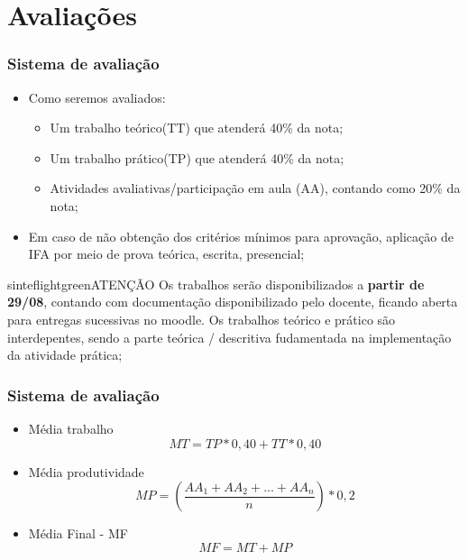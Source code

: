 \documentclass{beamer}
\begin{document}
\section{Avaliações}

\begin{frame}[fragile]\justifying
\frametitle{Sistema de avaliação}
\begin{itemize}
            
            \item Como seremos avaliados:
            \begin{itemize}
                  \item Um trabalho teórico(TT) que atenderá 40\% da nota;
                  \item Um trabalho prático(TP) que atenderá 40\% da nota;
                  \item Atividades avaliativas/participação em aula (AA), contando como 20\% da nota;
            \end{itemize}
            \item Em caso de não obtenção dos critérios mínimos para aprovação, aplicação de IFA por meio de prova teórica, escrita, presencial;
\end{itemize}
\begin{colorblock}[black]{sinteflightgreen}{ATENÇÃO}
      Os trabalhos serão disponibilizados a \textbf{partir de 29/08}, contando com documentação disponibilizado pelo docente, ficando aberta para entregas sucessivas no moodle.
      Os trabalhos teórico e prático são interdepentes, sendo a parte teórica / descritiva fudamentada na implementação da atividade prática;
\end{colorblock}

\end{frame}


\begin{frame}[fragile]\justifying
      \frametitle{Sistema de avaliação}
      \begin{itemize}
            \item Média trabalho \[ MT = TP * 0,40 + TT * 0,40\]
            \item Média produtividade \[ MP = \left ( \frac{AA_1 + AA_2 + ... + AA_n}n \right ) * 0,2 \]
            \item Média Final - MF \[MF = MT + MP\]
      \end{itemize}
      
      \end{frame}
      \footlinecolor{}
\end{document}
